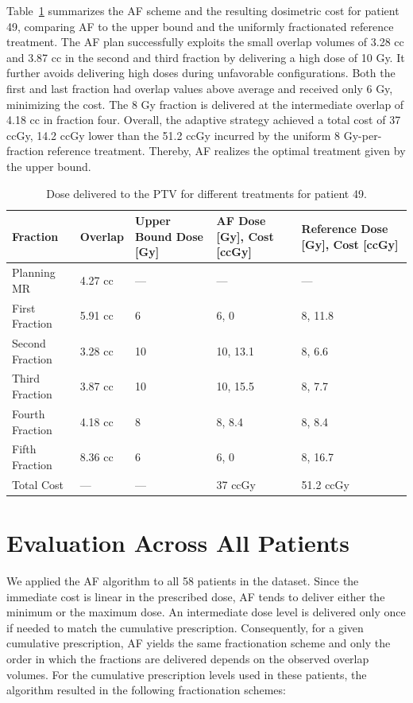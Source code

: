 \documentclass[11pt]{article}
\newcommand{\toprule}{\hline}
\newcommand{\midrule}{\hline}
\newcommand{\bottomrule}{\hline}
\begin{document}
Table~\ref{tab:patient49-2025} summarizes the AF scheme and the resulting dosimetric cost for patient 49, comparing AF to the upper bound and the uniformly fractionated reference treatment. The AF plan successfully exploits the small overlap volumes of 3.28 cc and 3.87 cc in the second and third fraction by delivering a high dose of 10 Gy. It further avoids delivering high doses during unfavorable configurations. Both the first and last fraction had overlap values above average and received only 6 Gy, minimizing the cost. The 8 Gy fraction is delivered at the intermediate overlap of 4.18 cc in fraction four. Overall, the adaptive strategy achieved a total cost of 37 ccGy, 14.2 ccGy lower than the 51.2 ccGy incurred by the uniform 8 Gy-per-fraction reference treatment. Thereby, AF realizes the optimal treatment given by the upper bound.

\begin{table}[ht]
\centering
\caption{Dose delivered to the PTV for different treatments for patient 49.}
\label{tab:patient49-2025}
\begin{tabular}{lllll}
\toprule
Fraction & Overlap & Upper Bound Dose [Gy] & AF Dose [Gy], Cost [ccGy] & Reference Dose [Gy], Cost [ccGy] \\
\midrule
Planning MR & 4.27 cc & --- & --- & --- \\
First Fraction & 5.91 cc & 6 & 6, 0 & 8, 11.8 \\
Second Fraction & 3.28 cc & 10 & 10, 13.1 & 8, 6.6 \\
Third Fraction & 3.87 cc & 10 & 10, 15.5 & 8, 7.7 \\
Fourth Fraction & 4.18 cc & 8 & 8, 8.4 & 8, 8.4 \\
Fifth Fraction & 8.36 cc & 6 & 6, 0 & 8, 16.7 \\
Total Cost & --- & --- & 37 ccGy & 51.2 ccGy \\
\bottomrule
\end{tabular}
\end{table}

\section{Evaluation Across All Patients}

We applied the AF algorithm to all 58 patients in the dataset. Since the immediate cost is linear in the prescribed dose, AF tends to deliver either the minimum or the maximum dose. An intermediate dose level is delivered only once if needed to match the cumulative prescription. Consequently, for a given cumulative prescription, AF yields the same fractionation scheme and only the order in which the fractions are delivered depends on the observed overlap volumes. For the cumulative prescription levels used in these patients, the algorithm resulted in the following fractionation schemes:
\end{document}
